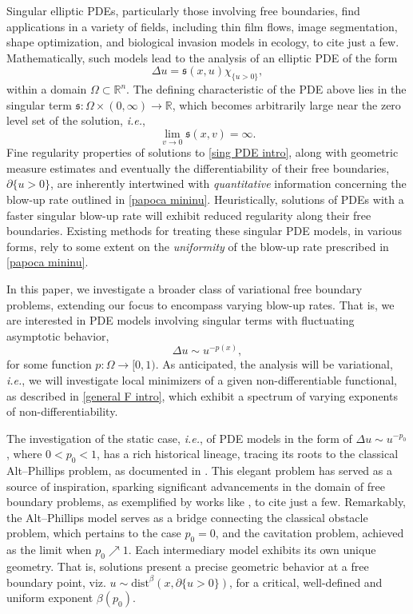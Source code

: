 \documentclass[reqno,11pt]{amsart}
\newcommand{\1}{\mathds{1}}
\numberwithin{equation}{section}
\begin{document}
Singular elliptic PDEs, particularly those involving free boundaries, find applications in a variety of fields, including thin film flows, image segmentation, shape optimization, and biological invasion models in ecology, to cite just a few. Mathematically, such models lead to the analysis of an elliptic PDE of the form
\begin{equation}\label{sing PDE intro}    
    \Delta u = \mathfrak{s}(x,u)\chi_{\{u>0 \}},  
\end{equation}
within a domain $\Omega \subset \mathbb{R}^n$. The defining characteristic of the PDE above lies in the singular term $\mathfrak{s}\colon \Omega \times (0,\infty) \to \mathbb{R}$, which becomes arbitrarily large near the zero level set of the solution, \textit{i.e.}, 
\begin{equation}\label{papoca mininu}
    \lim\limits_{v\to 0} \mathfrak{s}(x,v) = \infty.
\end{equation}
Fine regularity properties of solutions to \eqref{sing PDE intro}, along with geometric measure estimates and eventually the differentiability of their free boundaries, $\partial \{u> 0 \}$, are inherently intertwined with {\it quantitative} information concerning the blow-up rate outlined in \eqref{papoca mininu}. Heuristically, solutions of PDEs with a faster singular blow-up rate will exhibit reduced regularity along their free boundaries. Existing methods for treating these singular PDE models, in various forms, rely to some extent on the {\it uniformity} of the blow-up rate prescribed in \eqref{papoca mininu}. 

In this paper, we investigate a broader class of variational free boundary problems, extending our focus to encompass varying blow-up rates. That is, we are interested in PDE models involving singular terms with fluctuating asymptotic behavior, 
\begin{equation}\label{intro motivacao eq1}
    \Delta u  \sim u^{-p(x)},
\end{equation}
for some function $p\colon \Omega \to [0,1)$. As anticipated, the analysis will be variational, \textit{i.e.}, we will investigate local minimizers of a given non-differentiable functional, as described in \eqref{general F intro}, which exhibit a spectrum of varying exponents of non-differentiability. 

The investigation of the static case, \textit{i.e.}, of PDE models in the form of $\Delta u \sim u^{-p_0}$, where $0 < p_0 < 1$, has a rich historical lineage, tracing its roots to the classical Alt--Phillips problem, as documented in \cite{AP, P1, P2}. This elegant problem has served as a source of inspiration, sparking significant advancements in the domain of free boundary problems, as exemplified by works like \cite{AT, DSS, DKV, ES, ST, Teix, WY, Y}, to cite just a few. Remarkably, the Alt--Phillips model serves as a bridge connecting the classical obstacle problem, which pertains to the case $p_0 = 0$, and the cavitation problem, achieved as the limit when $p_0 \nearrow 1$. Each intermediary model exhibits its own unique geometry. That is, solutions present a precise geometric behavior at a free boundary point, viz. $u \sim \text{dist}^{\beta}(x, \partial \{u> 0\})$, for a critical, well-defined and uniform exponent $\beta(p_0)$. 
\end{document}
